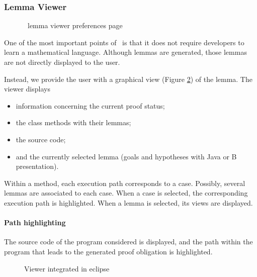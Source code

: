 \subsubsection{Lemma Viewer}
\begin{figure}[p]
 \caption{\JACK\ lemma viewer preferences page}
 \label{JACKlemviewprefpage}
\end{figure}
\label{Viewer}
One of the most important points of \JACK\ is that it does not require
developers to learn a mathematical language.  Although lemmas are
generated, those lemmas are not directly displayed to the user.

Instead, we provide the user with a graphical view (Figure \ref{Viewer image}) of the lemma.
 The viewer displays
 \begin{itemize}
  \item information concerning the current proof status;
  \item the class methods with their lemmas;
  \item the source code;
  \item and the currently selected lemma (goals and hypotheses with Java or B presentation).
\end{itemize}
 Within a method, each execution path corresponds to a case.
 Possibly, several lemmas are associated to each case.
 When a case is selected, the corresponding execution path is highlighted.
 When a lemma is selected, its views are displayed.
\paragraph{Path highlighting}
The source code of the program considered is displayed, and the
path within the program that leads to the generated proof obligation
is highlighted.

\begin{figure}[p]
 \caption{Viewer integrated in eclipse}
 \label{Viewer image}
\end{figure}

